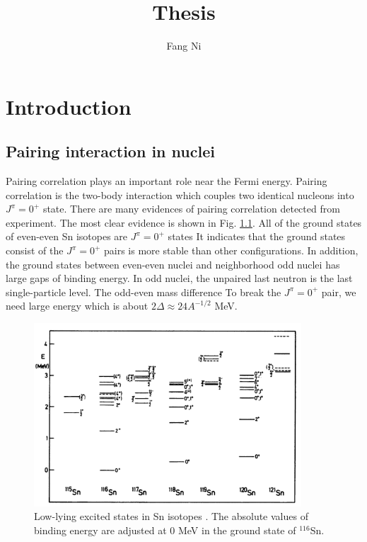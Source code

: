 \documentclass[11pt]{book} %
\title{Thesis}
\author{Fang Ni}
\begin{document}
\maketitle

\tableofcontents

\chapter{Introduction}

\section{Pairing interaction in nuclei}

Pairing correlation plays an important role near the Fermi energy. Pairing correlation is the two-body interaction which couples two identical nucleons into $J^{\pi}=0^+$ state. There are many evidences of pairing correlation detected from experiment. The most clear evidence is shown in Fig. \ref{Sn_isotope}. All of the ground states of even-even Sn isotopes are $J^{\pi}=0^+$ states  It indicates that the ground states consist of the $J^{\pi}=0^+$ pairs is more stable than other configurations. In addition, the ground states between even-even nuclei and neighborhood odd nuclei has large gaps of binding energy. In odd nuclei, the unpaired last neutron is the last single-particle level. The odd-even mass difference  To break the $J^{\pi}=0^+$ pair, we need large energy which is about $2\Delta \approx 24A^{-1/2}$ MeV.
\begin{figure}[htbp]
 \begin{center}
    \includegraphics[width=100mm, bb=0 0 400 300]{images/Sn_isotope.png}
 \end{center}
  \caption{Low-lying excited states in Sn isotopes \cite{}. The absolute values of binding energy are adjusted at 0 MeV in the ground state of ${}^{116}$Sn.}
  \label{Sn_isotope}
\end{figure}
\end{document}
